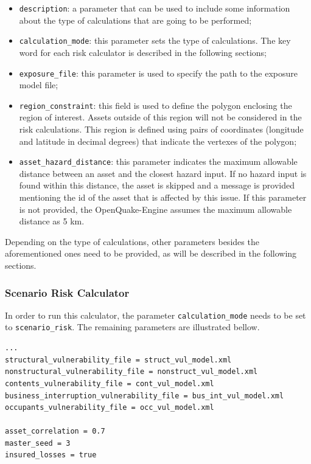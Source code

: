 \begin{itemize}
\item  \Verb+description+: a parameter that can be used to include some information about the type of calculations that are going to be performed;
\item  \Verb+calculation_mode+: this parameter sets the type of calculations. The key word for each risk calculator is described in the following sections;
\item  \Verb+exposure_file+: this parameter is used to specify the path to the \gls{exposure model} file;
\item  \Verb+region_constraint+: this field is used to define the polygon enclosing the region of interest. Assets outside of this region will not be considered in the risk calculations. This region is defined using pairs of coordinates (longitude and latitude in decimal degrees) that indicate the vertexes of the polygon;
\item  \Verb+asset_hazard_distance+: this parameter indicates the maximum allowable distance between an \gls{asset} and the closest hazard input. If no hazard input is found within this distance, the \gls{asset} is skipped and a message is provided mentioning the id of the asset that is affected by this issue. If this parameter is not provided, the OpenQuake-Engine assumes the maximum allowable distance as 5 km.
\end{itemize}

Depending on the type of calculations, other parameters besides the aforementioned ones need to be provided, as will be described in the following sections.

\subsubsection{Scenario Risk Calculator}
In order to run this calculator, the parameter \Verb+calculation_mode+ needs to be set to \Verb+scenario_risk+. The remaining parameters are illustrated bellow.

\begin{Verbatim}[frame=single, commandchars=\\\{\}, samepage=true]
...
structural_vulnerability_file = struct_vul_model.xml
nonstructural_vulnerability_file = nonstruct_vul_model.xml
contents_vulnerability_file = cont_vul_model.xml
business_interruption_vulnerability_file = bus_int_vul_model.xml
occupants_vulnerability_file = occ_vul_model.xml

asset_correlation = 0.7
master_seed = 3
insured_losses = true
\end{Verbatim}

